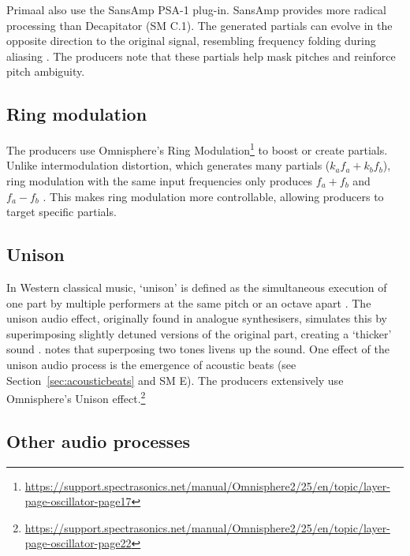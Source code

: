 \documentclass{article}
\begin{document}
Primaal also use the SansAmp PSA-1 plug-in. SansAmp provides more radical processing than Decapitator (SM C.1). The generated partials can evolve in the opposite direction to the original signal, resembling frequency folding during aliasing \citep{park1993aliasing}. The producers note that these partials help mask pitches and reinforce pitch ambiguity. %


\subsection{Ring modulation}\label{ref:ringmodulation}

The producers use Omnisphere's Ring Modulation\footnote{\url{https://support.spectrasonics.net/manual/Omnisphere2/25/en/topic/layer-page-oscillator-page17}} to boost or create partials. Unlike intermodulation distortion, which generates many partials ($k_a f_a + k_b f_b$), ring modulation with the same input frequencies only produces $f_a+f_b$ and $f_a-f_b$ \citep{parker2011simple}. This makes ring modulation more controllable, allowing producers to target specific partials.


\subsection{Unison}\label{ref:unison}

In Western classical music, `unison' is defined as the simultaneous execution of one part by multiple performers at the same pitch or an octave apart \citep{Unison}. The unison audio effect, originally found in analogue synthesisers, simulates this by superimposing slightly detuned versions of the original part, creating a `thicker' sound \citep{dailyanalog2024}. \citet[p.~34]{roederer2008physics} notes that superposing two tones livens up the sound. One effect of the unison audio process is the emergence of acoustic beats (see Section~\ref{sec:acousticbeats} and SM E). The producers extensively use Omnisphere's Unison effect.\footnote{\url{https://support.spectrasonics.net/manual/Omnisphere2/25/en/topic/layer-page-oscillator-page22}}




\subsection{Other audio processes}\label{ref:otheraudioprocs}
\end{document}
